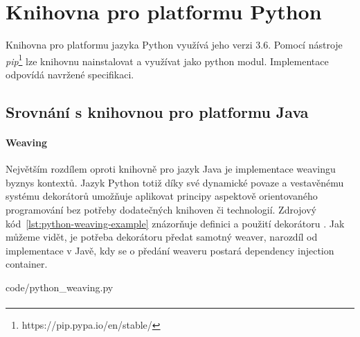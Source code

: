 \section{Knihovna pro platformu Python}

Knihovna pro platformu jazyka Python využívá jeho
verzi 3.6. Pomocí nástroje \textit{pip}\footnote{https://pip.pypa.io/en/stable/}
lze knihovnu nainstalovat a využívat jako python modul.
Implementace odpovídá navržené specifikaci.


\subsection{Srovnání s knihovnou pro platformu Java}

\paragraph{Weaving} Největším rozdílem oproti knihovně pro
jazyk Java je implementace weavingu byznys kontextů.
Jazyk Python totiž díky své dynamické povaze a vestavěnému
systému dekorátorů umožňuje aplikovat principy aspektově orientovaného
programování bez potřeby dodatečných knihoven či technologií.
Zdrojový kód~\ref{lst:python-weaving-example} znázorňuje
definici a použití dekorátoru .
Jak můžeme vidět, je potřeba dekorátoru předat samotný weaver, narozdíl
od implementace v Javě, kdy se o předání weaveru postará dependency
injection container.


{code/python_weaving.py}

\paragraph{}

